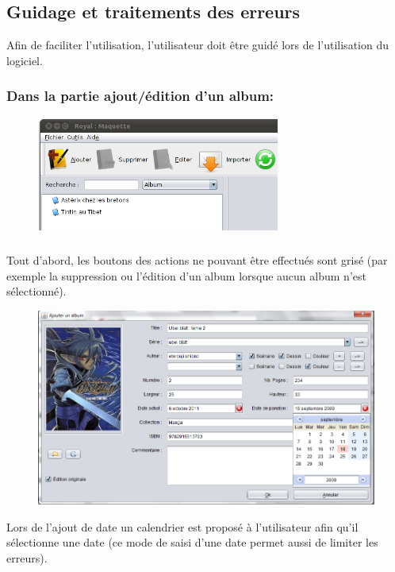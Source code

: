 \documentclass[etudiants]{support-iutrs}
\begin{document}
\subsection{Guidage et traitements des erreurs} 
Afin de faciliter l'utilisation, l'utilisateur doit être guidé lors de l'utilisation du logiciel.

\subsubsection{Dans la partie ajout/édition d'un album:}

\begin{figure}
\includegraphics[width=8cm]{img/app_pc_maquette_btn_grise.png}
\end{figure}\subparagraph{}

Tout d'abord, les boutons des actions ne pouvant être effectués sont grisé (par exemple la suppression ou l’édition d'un album lorsque aucun album n'est sélectionné).
\clearpage

\begin{figure}[h!]
\begin{center}
\includegraphics[width=12cm]{img/app_pc_maquette_ajout_album.png}
\end{center}
\end{figure}
Lors de l'ajout de date un calendrier est proposé à l'utilisateur afin qu’il sélectionne une date (ce mode de saisi d'une date permet aussi de limiter les erreurs).
\end{document}
